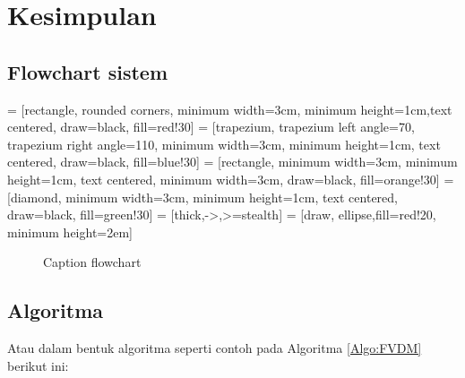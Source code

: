 \chapter{Kesimpulan}
\section{Flowchart sistem}

 = [rectangle, rounded corners, minimum width=3cm, minimum height=1cm,text centered, draw=black, fill=red!30]
 = [trapezium, trapezium left angle=70, trapezium right angle=110, minimum width=3cm, minimum height=1cm, text centered, draw=black, fill=blue!30]
 = [rectangle, minimum width=3cm, minimum height=1cm, text centered, minimum width=3cm, draw=black, fill=orange!30]
 = [diamond, minimum width=3cm, minimum height=1cm, text centered, draw=black, fill=green!30]
 = [thick,->,>=stealth]
 = [draw, ellipse,fill=red!20,
    minimum height=2em]

\begin{figure}[h!]
    \centering
    \caption{Caption flowchart}
    \label{figflow}
\end{figure}

\section{Algoritma}
 Atau dalam bentuk algoritma seperti contoh pada Algoritma \ref{Algo:FVDM} berikut ini:
 

